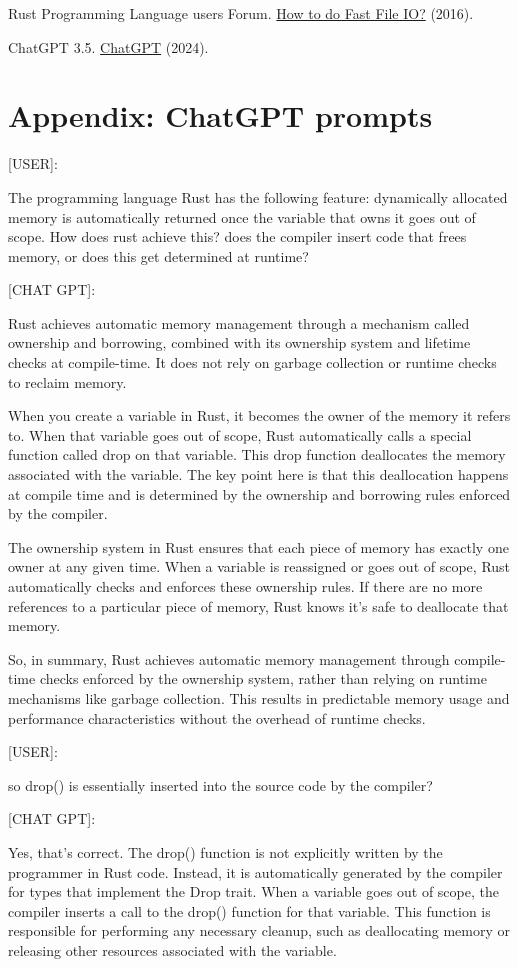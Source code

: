     Rust Programming Language users Forum. \href{https://users.rust-lang.org/t/how-to-do-fast-file-io/8278/5}{How to do Fast File IO?} (2016).
    
    ChatGPT 3.5. \href{https://chat.openai.com}{ChatGPT} (2024).

\section{Appendix: ChatGPT prompts}
[USER]: 

The programming language Rust has the following feature: dynamically allocated memory is automatically returned once the variable that owns it goes out of scope. How does rust achieve this? does the compiler insert code that frees memory, or does this get determined at runtime?

[CHAT GPT]:

Rust achieves automatic memory management through a mechanism called ownership and borrowing, combined with its ownership system and lifetime checks at compile-time. It does not rely on garbage collection or runtime checks to reclaim memory.

When you create a variable in Rust, it becomes the owner of the memory it refers to. When that variable goes out of scope, Rust automatically calls a special function called drop on that variable. This drop function deallocates the memory associated with the variable. The key point here is that this deallocation happens at compile time and is determined by the ownership and borrowing rules enforced by the compiler.

The ownership system in Rust ensures that each piece of memory has exactly one owner at any given time. When a variable is reassigned or goes out of scope, Rust automatically checks and enforces these ownership rules. If there are no more references to a particular piece of memory, Rust knows it's safe to deallocate that memory.

So, in summary, Rust achieves automatic memory management through compile-time checks enforced by the ownership system, rather than relying on runtime mechanisms like garbage collection. This results in predictable memory usage and performance characteristics without the overhead of runtime checks.

[USER]:

so drop() is essentially inserted into the source code by the compiler?

[CHAT GPT]:

Yes, that's correct. The drop() function is not explicitly written by the programmer in Rust code. Instead, it is automatically generated by the compiler for types that implement the Drop trait. When a variable goes out of scope, the compiler inserts a call to the drop() function for that variable. This function is responsible for performing any necessary cleanup, such as deallocating memory or releasing other resources associated with the variable.

